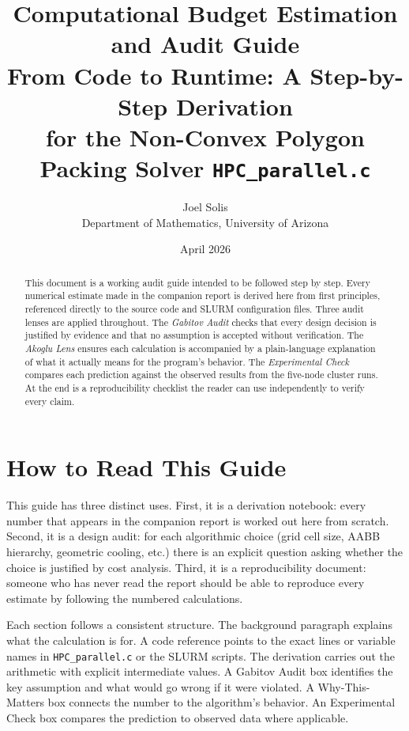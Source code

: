 \documentclass[11pt,oneside]{article}
\title{%
  \textbf{Computational Budget Estimation and Audit Guide}\\[6pt]
  {\large From Code to Runtime: A Step-by-Step Derivation}\\[4pt]
  {\normalsize for the Non-Convex Polygon Packing Solver \texttt{HPC\_parallel.c}}%
}
\author{Joel Solis\\
  {\small Department of Mathematics, University of Arizona}}
\date{April 2026}
\begin{document}
\maketitle
\thispagestyle{empty}

\begin{abstract}
This document is a working audit guide intended to be followed step by
step. Every numerical estimate made in the companion report is derived
here from first principles, referenced directly to the source code and
SLURM configuration files. Three audit lenses are applied throughout.
The \emph{Gabitov Audit} checks that every design decision is
justified by evidence and that no assumption is accepted without
verification. The \emph{Akoglu Lens} ensures each calculation is
accompanied by a plain-language explanation of what it actually means
for the program's behavior. The \emph{Experimental Check} compares
each prediction against the observed results from the five-node cluster
runs. At the end is a reproducibility checklist the reader can use
independently to verify every claim.
\end{abstract}

\tableofcontents
\newpage

\section{How to Read This Guide}
\label{sec:howto}

This guide has three distinct uses. First, it is a derivation notebook:
every number that appears in the companion report is worked out here
from scratch. Second, it is a design audit: for each algorithmic choice
(grid cell size, AABB hierarchy, geometric cooling, etc.) there is an
explicit question asking whether the choice is justified by cost
analysis. Third, it is a reproducibility document: someone who has
never read the report should be able to reproduce every estimate by
following the numbered calculations.

Each section follows a consistent structure. The background paragraph
explains what the calculation is for. A code reference points to the
exact lines or variable names in \texttt{HPC\_parallel.c} or the SLURM
scripts. The derivation carries out the arithmetic with explicit
intermediate values. A Gabitov Audit box identifies the key assumption
and what would go wrong if it were violated. A Why-This-Matters box
connects the number to the algorithm's behavior. An Experimental Check
box compares the prediction to observed data where applicable.
\end{document}
